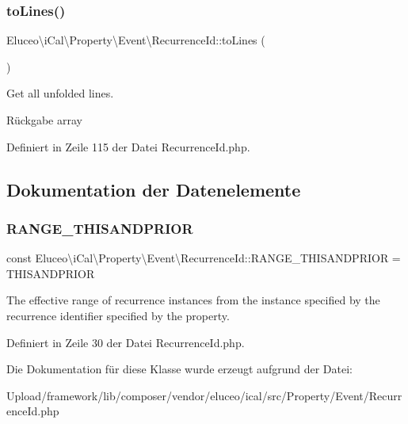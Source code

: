 \subsubsection{\texorpdfstring{to\+Lines()}{toLines()}\hspace{0.1cm}{\footnotesize\ttfamily [3/3]}}
{\footnotesize\ttfamily Eluceo\textbackslash{}i\+Cal\textbackslash{}\+Property\textbackslash{}\+Event\textbackslash{}\+Recurrence\+Id\+::to\+Lines (\begin{DoxyParamCaption}{ }\end{DoxyParamCaption})}

Get all unfolded lines.

\begin{DoxyReturn}{Rückgabe}
array 
\end{DoxyReturn}


Definiert in Zeile 115 der Datei Recurrence\+Id.\+php.



\subsection{Dokumentation der Datenelemente}
\mbox{\label{class_eluceo_1_1i_cal_1_1_property_1_1_event_1_1_recurrence_id_a32c13b95be95c9f7d54f1da8679d3cea}} 
\subsubsection{\texorpdfstring{R\+A\+N\+G\+E\+\_\+\+T\+H\+I\+S\+A\+N\+D\+P\+R\+I\+OR}{RANGE\_THISANDPRIOR}}
{\footnotesize\ttfamily const Eluceo\textbackslash{}i\+Cal\textbackslash{}\+Property\textbackslash{}\+Event\textbackslash{}\+Recurrence\+Id\+::\+R\+A\+N\+G\+E\+\_\+\+T\+H\+I\+S\+A\+N\+D\+P\+R\+I\+OR = \textquotesingle{}T\+H\+I\+S\+A\+N\+D\+P\+R\+I\+OR\textquotesingle{}}

The effective range of recurrence instances from the instance specified by the recurrence identifier specified by the property. 

Definiert in Zeile 30 der Datei Recurrence\+Id.\+php.



Die Dokumentation für diese Klasse wurde erzeugt aufgrund der Datei\+:\begin{DoxyCompactItemize}
\item 
Upload/framework/lib/composer/vendor/eluceo/ical/src/\+Property/\+Event/Recurrence\+Id.\+php\end{DoxyCompactItemize}
